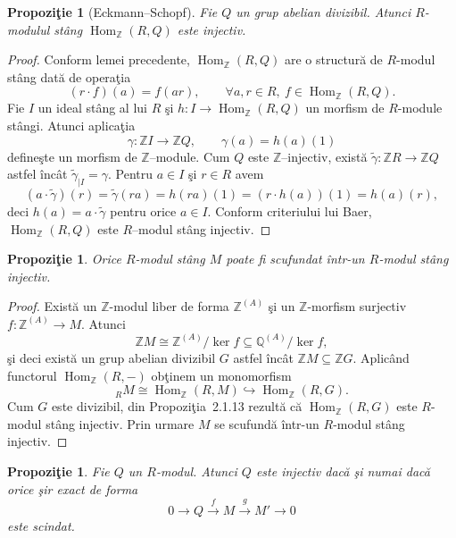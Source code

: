 \documentclass[12pt,a4paper]{book}
\DeclareMathOperator{\Hom}{Hom}
\theoremstyle{plain}
\newtheorem{proposition}[theorem]{Propoziţie}
\theoremstyle{definition}
\theoremstyle{remark}
\begin{document}
\begin{proposition}[Eckmann–Schopf]
Fie \(Q\) un grup abelian divizibil. Atunci \(R\)-modulul stâng \(\Hom_\mathbb{Z}(R,Q)\) este injectiv.
\end{proposition}

\begin{proof}
Conform lemei precedente, $\Hom_{\mathbb{Z}}(R,Q)$ are o structură de
$R$-modul stâng dată de operaţia
\[
(r \cdot f)(a) = f(ar), \qquad \forall a,r \in R,\ f \in \Hom_{\mathbb{Z}}(R,Q).
\]
Fie $I$ un ideal stâng al lui $R$ şi $h : I \to \Hom_{\mathbb{Z}}(R,Q)$
un morfism de $R$-module stângi. Atunci aplicaţia
\[
\gamma : \mathbb{Z}I \longrightarrow \mathbb{Z}Q, \qquad
\gamma(a) = h(a)(1)
\]
defineşte un morfism de $\mathbb{Z}$–module.
Cum $Q$ este $\mathbb{Z}$–injectiv, există
$\widetilde{\gamma} : \mathbb{Z}R \to \mathbb{Z}Q$ astfel încât
$\widetilde{\gamma}_{\mid I} = \gamma$.
Pentru $a \in I$ şi $r \in R$ avem
\[
(a \cdot \widetilde{\gamma})(r)
  = \widetilde{\gamma}(ra)
  = h(ra)(1)
  = (r \cdot h(a))(1)
  = h(a)(r),
\]
deci $h(a) = a \cdot \widetilde{\gamma}$ pentru orice $a \in I$.
Conform criteriului lui Baer, $\Hom_{\mathbb{Z}}(R,Q)$ este
$R$–modul stâng injectiv.
\end{proof}


\begin{proposition}
Orice $R$-modul stâng $M$ poate fi scufundat într-un
$R$-modul stâng injectiv.
\end{proposition}

\begin{proof}
Există un $\mathbb{Z}$-modul liber de forma $\mathbb{Z}^{(A)}$ şi
un $\mathbb{Z}$-morfism surjectiv $f : \mathbb{Z}^{(A)} \to M$.
Atunci
\[
\mathbb{Z}M \cong \mathbb{Z}^{(A)} / \ker f
  \subseteq \mathbb{Q}^{(A)} / \ker f,
\]
şi deci există un grup abelian divizibil $G$ astfel încât
$\mathbb{Z}M \subseteq \mathbb{Z}G$.
Aplicând functorul $\Hom_{\mathbb{Z}}(R,-)$ obţinem un monomorfism
\[
{}_R M \cong \Hom_{\mathbb{Z}}(R,M)
   \hookrightarrow \Hom_{\mathbb{Z}}(R,G).
\]
Cum $G$ este divizibil, din Propoziţia~2.1.13 rezultă că
$\Hom_{\mathbb{Z}}(R,G)$ este $R$-modul stâng injectiv.
Prin urmare $M$ se scufundă într-un $R$-modul stâng injectiv.
\end{proof}


\begin{proposition}
Fie $Q$ un $R$-modul. Atunci $Q$ este injectiv dacă şi numai dacă
orice şir exact de forma
\[
0 \longrightarrow Q \xrightarrow{f} M \xrightarrow{g} M' \longrightarrow 0
\]
este scindat.
\end{proposition}
\end{document}
